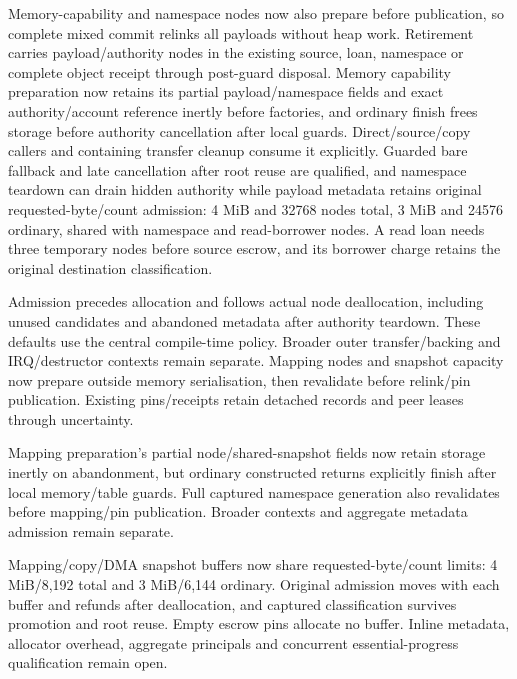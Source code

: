 \begin{itemize}
        Memory-capability and namespace nodes now also prepare before
        publication, so complete mixed commit relinks all payloads without heap work.
        Retirement carries payload/authority nodes in the existing source, loan,
        namespace or complete object receipt through post-guard disposal.
        Memory capability preparation now retains its partial payload/namespace
        fields and exact authority/account reference inertly before factories, and
        ordinary finish frees storage before authority cancellation after local
        guards. Direct/source/copy callers and containing transfer cleanup consume
        it explicitly. Guarded bare fallback and late cancellation after root reuse
        are qualified, and namespace teardown can drain hidden authority while payload
        metadata retains original requested-byte/count admission: 4 MiB and 32768
        nodes total, 3 MiB and 24576 ordinary, shared with namespace and read-borrower
        nodes. A read loan needs three temporary nodes before source escrow, and
        its borrower charge retains the original destination classification.
        
        Admission precedes allocation and follows actual node deallocation,
        including unused candidates and abandoned metadata after authority
        teardown. These defaults use the central compile-time policy. Broader outer transfer/backing
        and IRQ/destructor contexts remain separate.
        Mapping nodes and snapshot capacity now prepare outside memory
        serialisation, then revalidate before relink/pin publication. Existing
        pins/receipts retain detached records and peer leases through uncertainty.
        
        Mapping preparation's partial node/shared-snapshot fields now retain
        storage inertly on abandonment, but ordinary constructed returns explicitly
        finish after local memory/table guards. Full captured namespace generation
        also revalidates before mapping/pin publication. Broader contexts and
        aggregate metadata admission remain separate.
        
        Mapping/copy/DMA snapshot buffers now share requested-byte/count limits:
        4 MiB/8,192 total and 3 MiB/6,144 ordinary. Original admission moves with
        each buffer and refunds after deallocation, and captured classification
        survives promotion and root reuse. Empty escrow pins allocate no buffer.
        Inline metadata, allocator overhead, aggregate principals and concurrent
        essential-progress qualification remain open.
        

\end{itemize}
